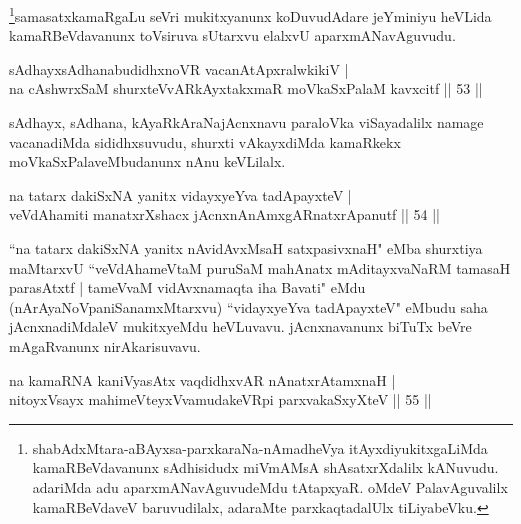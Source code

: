 \begin{artha}
\footnote{shabAdxMtara-aBAyxsa-parxkaraNa-nAmadheVya itAyxdiyukitxgaLiMda kamaRBeVdavanunx sAdhisidudx miVmAMsA shAsatxrXdalilx kANuvudu. adariMda adu aparxmANavAguvudeMdu tAtapxyaR. oMdeV PalavAguvalilx kamaRBeVdaveV baruvudilalx, adaraMte parxkaqtadalUlx tiLiyabeVku.}samasatxkamaRgaLu seVri mukitxyanunx koDuvudAdare jeYminiyu heVLida kamaRBeVdavanunx toVsiruva sUtarxvu elalxvU aparxmANavAguvudu.
\end{artha}


\begin{shl}
sAdhayxsAdhanabudidhxnoVR vacanAtApxralwkikiV |\\
na cAshwrxSaM shurxteVvARkAyxtakxmaR moVkaSxPalaM kavxcitf \hfill || 53 ||
\end{shl}

\begin{artha}
sAdhayx, sAdhana, kAyaRkAraNajAcnxnavu paraloVka viSayadalilx namage vacanadiMda sididhxsuvudu, shurxti vAkayxdiMda kamaRkekx moVkaSxPalaveMbudanunx nAnu keVLilalx.
\end{artha}


\begin{shl}
na tatarx dakiSxNA yanitx vidayxyeYva tadApayxteV |\\
veVdAhamiti manatxrXshacx jAcnxnAnAmxgARnatxrApanutf \hfill || 54 ||
\end{shl}


\begin{artha}
``na tatarx dakiSxNA yanitx nAvidAvxMsaH satxpasivxnaH" eMba shurxtiya maMtarxvU ``veVdAhameVtaM puruSaM mahAnatx mAditayxvaNaRM tamasaH parasAtxtf | tameVvaM vidAvxnamaqta iha Bavati" eMdu (nArAyaNoVpaniSanamxMtarxvu) ``vidayxyeYva tadApayxteV" eMbudu saha jAcnxnadiMdaleV mukitxyeMdu heVLuvavu. jAcnxnavanunx biTuTx beVre mAgaRvanunx nirAkarisuvavu.
\end{artha}


\begin{shl}
na kamaRNA kaniVyasAtx vaqdidhxvAR nAnatxrAtamxnaH |\\
nitoyxV\s sayx mahimeVteyxVvamudakeVR\s pi parxvakaSxyXteV \hfill || 55 ||
\end{shl}

